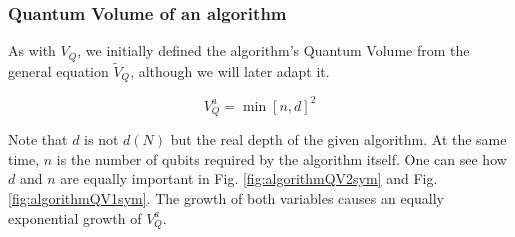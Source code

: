 \documentclass[11pt]{article}
\begin{document}
\subsubsection{Quantum Volume of an algorithm}
\label{sec:org87e7829}

As with \(V_Q\), we initially defined the algorithm's Quantum Volume from the general equation \(\tilde{V}_Q\), although we will later adapt it.

$$V_Q^a = \min \left[ n,d \right]^2$$

Note that \(d\) is not \(d(N)\) but the real depth of the given algorithm.
At the same time, \(n\) is the number of qubits required by the algorithm itself.
One can see how \(d\) and \(n\) are equally important in Fig. \ref{fig:algorithmQV2sym} and Fig. \ref{fig:algorithmQV1sym}.
The growth of both variables causes an equally exponential growth of \(V^a_Q\).

\end{document}
